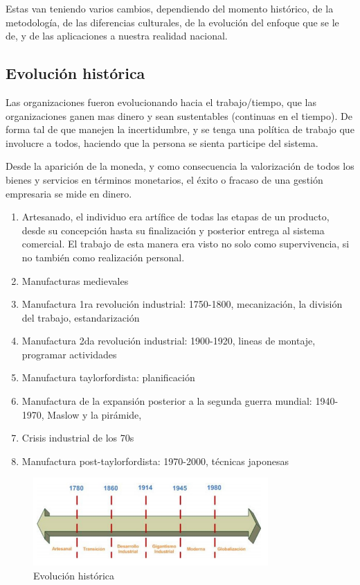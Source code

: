\documentclass[titlepage,a4paper]{article}
\begin{document}
Estas van teniendo varios cambios, dependiendo del momento histórico, de la metodología, de las diferencias culturales, de la evolución del enfoque que se le de, y de las aplicaciones a nuestra realidad nacional.

\subsection{Evolución histórica}
Las organizaciones fueron evolucionando hacia el trabajo/tiempo, que las organizaciones ganen mas dinero y sean sustentables (continuas en el tiempo). De forma tal de que manejen la incertidumbre, y se tenga una política de trabajo que involucre a todos, haciendo que la persona se sienta participe del sistema.

Desde la aparición de la moneda, y como consecuencia la valorización de todos los bienes y servicios en términos monetarios, el éxito o fracaso de una gestión empresaria se mide en dinero.

\begin{enumerate}
    \item Artesanado, el individuo era artífice de todas las etapas de un producto, desde su concepción hasta su finalización y posterior entrega al sistema comercial. El trabajo de esta manera era visto no solo como supervivencia, si no también como realización personal.
    \item Manufacturas medievales
    \item Manufactura 1ra revolución industrial: 1750-1800, mecanización, la división del trabajo, estandarización
    \item Manufactura 2da revolución industrial: 1900-1920, lineas de montaje, programar actividades
    \item Manufactura taylorfordista: planificación
    \item Manufactura de la expansión posterior a la segunda guerra mundial: 1940-1970,  Maslow y la pirámide,
    \item Crisis industrial de los 70s
    \item Manufactura post-taylorfordista: 1970-2000, técnicas japonesas
\end{enumerate}

\begin{figure}[!htb]
    \centering
    \includegraphics[width=0.8\textwidth]{imagenes/EvolucionHistorica.PNG}
    \caption{Evolución histórica}
\end{figure}
\end{document}
